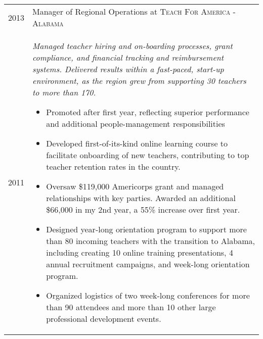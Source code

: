 \documentclass[a4paper,11pt]{article}
\begin{document}
\begin{longtable}{r|p{11.5cm}}
    2013 & Manager of Regional Operations at \textsc{Teach For America - Alabama} \\*
    2011 & \small{\emph{Managed teacher hiring and on-boarding processes, grant compliance, and financial tracking and reimbursement systems. Delivered results within a fast-paced, start-up environment, as the region grew from supporting 30 teachers to more than 170.}}
    \footnotesize{
    \begin{itemize}
        \item Promoted after first year, reflecting superior performance and additional people-management responsibilities
        \item Developed first-of-its-kind online learning course to facilitate onboarding of new teachers, contributing to top teacher retention rates in the country.
        \item Oversaw \$119,000 Americorps grant and managed relationships with key parties. Awarded an additional \$66,000 in my 2nd year, a 55\% increase over first year.
        \item Designed year-long orientation program to support more than 80 incoming teachers with the transition to Alabama, including creating 10 online training presentations, 4 annual recruitment campaigns, and week-long orientation program.
        \item Organized logistics of two week-long conferences for more than 90 attendees and more than 10 other large professional development events.
    \end{itemize}
    } \\*
\end{longtable}
\end{document}
